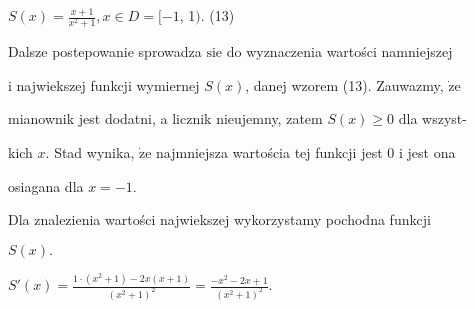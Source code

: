 \documentclass[a4paper,12pt]{article}
\begin{document}
$S(x)=\displaystyle \frac{x+1}{x^{2}+1}, x\in D=[-1$, 1$)$.   (13)

Dalsze postepowanie sprowadza $\mathrm{s}\mathrm{i}\mathrm{e}$ do wyznaczenia wartości namniejszej

$\mathrm{i}$ najwiekszej funkcji wymiernej $S(x)$, danej wzorem (13). Zauwazmy, $\dot{\mathrm{z}}\mathrm{e}$

mianownik jest dodatni, a licznik nieujemny, zatem $S(x) \geq 0$ dla wszyst-

kich $x$. Stad wynika, $\dot{\mathrm{z}}\mathrm{e}$ najmniejsza wartościa tej funkcji jest 0 $\mathrm{i}$ jest ona

osiagana dla $x=-1.$

Dla znalezienia wartości najwiekszej wykorzystamy pochodna funkcji

$S(x).$

$S'(x)=\displaystyle \frac{1\cdot(x^{2}+1)-2x(x+1)}{(x^{2}+1)^{2}}=\frac{-x^{2}-2x+1}{(x^{2}+1)^{2}}.$
\end{document}
